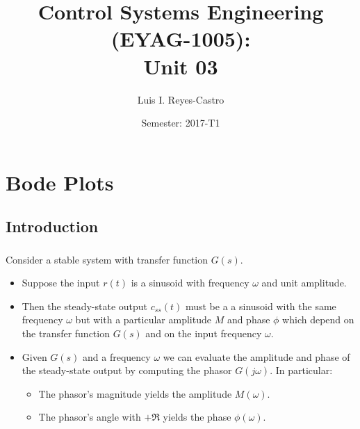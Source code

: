 \documentclass[ 10pt, xcolor = dvipsnames]{beamer}
\title[\shorttitle]{Control Systems Engineering (EYAG-1005): \\ \textbf{Unit 03} }
\author[L. I. Reyes-Castro]{Luis I. Reyes-Castro}
\institute[ESPOL]{\normalsize Escuela Superior Polit\'ecnica del Litoral (ESPOL) \\ Guayaquil - Ecuador}
\date[2017-T1]{Semester: 2017-T1}
\begin{document}



\section{Bode Plots}

\subsection{Introduction}

\begin{frame}[allowframebreaks]
\frametitle{\insertsection}

Consider a stable system with transfer function $G(s)$. 
\begin{itemize}
\item Suppose the input $r(t)$ is a sinusoid with frequency $\omega$ and unit amplitude. 
\item Then the steady-state output $c_{ss}(t)$ must be a a sinusoid with the same frequency $\omega$ but with a particular amplitude $M$ and phase $\phi$ which depend \linebreak on the transfer function $G(s)$ and on the input frequency $\omega$. 
\end{itemize}
\halfskip

\begin{figure}[htb]
\centering
\def\svgwidth{0.8\columnwidth}

\end{figure}
\framebreak

\begin{itemize}
\item Given $G(s)$ and a frequency $\omega$ we can evaluate the amplitude and phase of the steady-state output by computing the phasor $G(j\omega)$. In particular: 
\begin{itemize}
\item The phasor's magnitude yields the amplitude $M(\omega)$. 
\item The phasor's angle with $+\Re$ yields the phase $\phi(\omega)$. 
\end{itemize}
\halfskip
\begin{figure}[htb]
\centering
\def\svgwidth{0.72\columnwidth}

\end{figure}


\end{itemize}
\end{frame}
\end{document}

